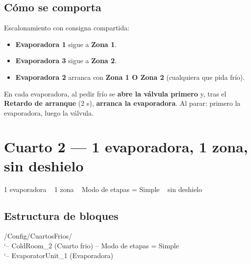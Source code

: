 \documentclass[11pt,a4paper]{article}
\newcommand{\md}{\,\textcolor{gris}{\textbullet}\,}
\newcommand{\slot}[1]{\textbf{#1}}
\begin{document}
\subsection{Cómo se comporta}
\begin{comporta}
Escalonamiento con consigna compartida:
\begin{itemize}[leftmargin=1.3em,itemsep=1pt,topsep=3pt]
  \item \textbf{Evaporadora 1} sigue a \textbf{Zona 1}.
  \item \textbf{Evaporadora 3} sigue a \textbf{Zona 2}.
  \item \textbf{Evaporadora 2} arranca con \textbf{Zona 1 O Zona 2} (cualquiera que pida frío).
\end{itemize}
En cada evaporadora, al pedir frío se \textbf{abre la válvula primero} y, tras el \slot{Retardo de arranque}
(2 s), \textbf{arranca la evaporadora}. Al parar: primero la evaporadora, luego la válvula.
\end{comporta}

\section{Cuarto 2 — 1 evaporadora, 1 zona, sin deshielo}
\begin{ficha}{}1 evaporadora \md\ 1 zona \md\ Modo de etapas = Simple \md\ sin deshielo\end{ficha}

\subsection{Estructura de bloques}
\begin{arbol}
/Config/CuartosFrios/\\
`-- ColdRoom_2           (Cuarto frio)  -- Modo de etapas = Simple\\
\phantom{`-- }`-- EvaporatorUnit_1  (Evaporadora)
\end{arbol}
\end{document}
